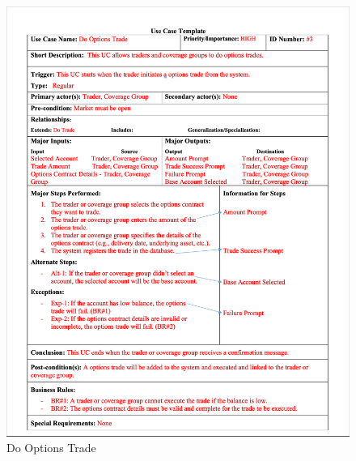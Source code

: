 \documentclass[a4paper]{report}
\begin{document}
\begin{figure}[h!]
    \centering
    \includegraphics[width=\textwidth]{images/uc/4-do-options-trade.png}
    \caption{Do Options Trade}
    \label{fig:4-do-options-trade}
\end{figure}
\end{document}
